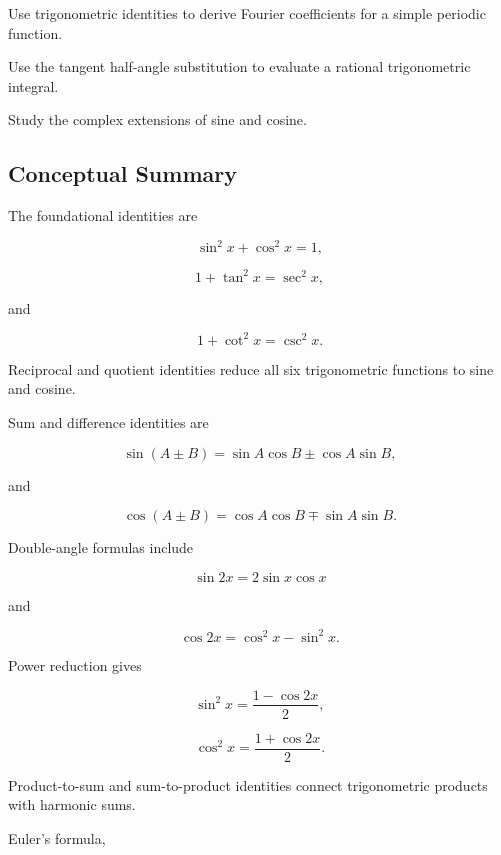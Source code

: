 \begin{exercise}[4]
Use trigonometric identities to derive Fourier coefficients for a simple
periodic function.
\end{exercise}

\begin{exercise}[4]
Use the tangent half-angle substitution to evaluate a rational trigonometric
integral.
\end{exercise}

\begin{exercise}[4]
Study the complex extensions of sine and cosine.
\end{exercise}

\subsection{Conceptual Summary}
\label{subsec:trigonometric-identities-summary}

The foundational identities are

\[
\boxed{
\sin^2x+\cos^2x=1,
}
\]

\[
\boxed{
1+\tan^2x=\sec^2x,
}
\]

and

\[
\boxed{
1+\cot^2x=\csc^2x.
}
\]

Reciprocal and quotient identities reduce all six trigonometric functions to
sine and cosine.

Sum and difference identities are

\[
\boxed{
\sin(A\pm B)
=
\sin A\cos B
\pm
\cos A\sin B,
}
\]

and

\[
\boxed{
\cos(A\pm B)
=
\cos A\cos B
\mp
\sin A\sin B.
}
\]

Double-angle formulas include

\[
\boxed{
\sin2x=2\sin x\cos x
}
\]

and

\[
\boxed{
\cos2x
=
\cos^2x-\sin^2x.
}
\]

Power reduction gives

\[
\boxed{
\sin^2x
=
\frac{1-\cos2x}{2},
}
\]

\[
\boxed{
\cos^2x
=
\frac{1+\cos2x}{2}.
}
\]

Product-to-sum and sum-to-product identities connect trigonometric products
with harmonic sums.

Euler's formula,

